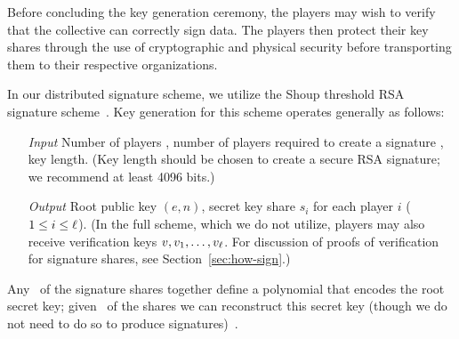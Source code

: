 Before concluding the key generation ceremony, the players may wish to
verify that the collective can correctly sign data. The players then
protect their key shares through the use of cryptographic and physical
security before transporting them to their respective organizations.


In our distributed signature scheme, we utilize the Shoup threshold
RSA signature
 scheme~\cite{shoup-sig}. Key generation for this
scheme operates
 generally as follows:
\begin{itemize}
\item[{\it Input}] Number of players \nump, number of players required
to create a signature \nums, key length. (Key length should be chosen
to create a secure RSA signature; we recommend at least 4096 bits.)

\item[{\it Output}] Root public key $(e,n)$, secret key share $s_i$
for each player $i$ ($1 \leq i \leq \ell$). (In the full scheme, which we do not utilize, players may also receive verification keys $v,
v_1, \dots, v_{\ell}$. For discussion of proofs of verification for
signature shares, see Section~\ref{sec:how-sign}.)
\end{itemize}
Any \nums\ of the signature shares together define a polynomial that
encodes the root secret key; given \nums\ of the shares we can
reconstruct this secret key (though we do not need to do so to produce
signatures)~\cite{shamirshare}.



